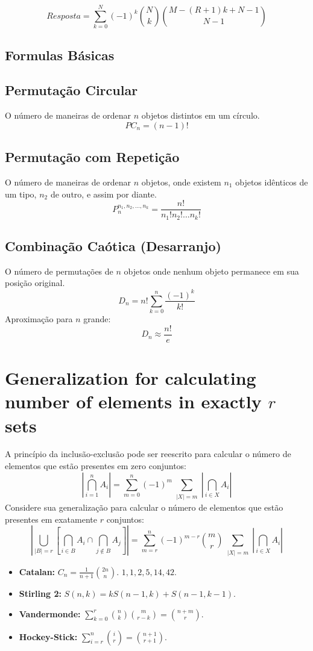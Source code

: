 $$ Resposta = \sum^{N}_{k=0} (-1)^k \binom{N}{k} \binom{M - (R + 1) k + N - 1}{N-1} $$

\subsection{Formulas Básicas}

\subsection*{Permutação Circular}
O número de maneiras de ordenar $n$ objetos distintos em um círculo.
$$ PC_n = (n-1)! $$

\subsection*{Permutação com Repetição}
O número de maneiras de ordenar $n$ objetos, onde existem $n_1$ objetos idênticos de um tipo, $n_2$ de outro, e assim por diante.
$$ P_n^{n_1, n_2, \dots, n_k} = \frac{n!}{n_1! n_2! \dots n_k!} $$

\subsection*{Combinação Caótica (Desarranjo)}
O número de permutações de $n$ objetos onde nenhum objeto permanece em sua posição original.
$$ D_n = n! \sum_{k=0}^{n} \frac{(-1)^k}{k!} $$
Aproximação para $n$ grande:
$$ D_n \approx \frac{n!}{e} $$

\section*{Generalization for calculating number of elements in exactly \( r \) sets}
A princípio da inclusão-exclusão pode ser reescrito para calcular o número de elementos que estão presentes em zero conjuntos:
\[
\left| \bigcap_{i=1}^{n} A_i \right| = \sum_{m=0}^{n} (-1)^m \sum_{\substack{|X|=m}} \left| \bigcap_{i \in X} A_i \right|
\]
Considere sua generalização para calcular o número de elementos que estão presentes em exatamente \( r \) conjuntos:
\[
\left| \bigcup_{|B|=r} \left[ \bigcap_{i \in B} A_i \cap \bigcap_{j \notin B} A_j \right] \right| = \sum_{m=r}^{n} (-1)^{m-r} \binom{m}{r} \sum_{\substack{|X|=m}} \left| \bigcap_{i \in X} A_i \right|
\]

\begin{itemize}[leftmargin=*, nosep]
    \item \textbf{Catalan:} $C_n = \frac{1}{n+1}\binom{2n}{n}$. $1, 1, 2, 5, 14, 42$.
    \item \textbf{Stirling 2:} $S(n,k) = k S(n-1, k) + S(n-1, k-1)$.
    \item \textbf{Vandermonde:} $\sum_{k=0}^r \binom{n}{k}\binom{m}{r-k} = \binom{n+m}{r}$.
    \item \textbf{Hockey-Stick:} $\sum_{i=r}^n \binom{i}{r} = \binom{n+1}{r+1}$.
\end{itemize}
